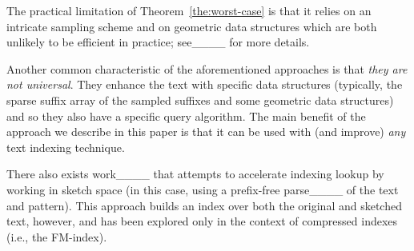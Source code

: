 The practical limitation of Theorem~\ref{the:worst-case} is that it relies on
an intricate sampling scheme and on geometric data structures
which are both unlikely to be efficient in practice; see____ for more details.


Another common characteristic of the aforementioned approaches %
is that \emph{they are not universal}. They enhance the text with specific data structures (typically, the sparse suffix array of the sampled suffixes and some geometric data structures) and so they also have a specific query algorithm. The main benefit of the approach we describe in this paper is that it can be used with (and improve) 
\emph{any} text indexing technique.

 There also exists work____ that attempts to accelerate indexing lookup by working in sketch space (in this case, using a prefix-free parse____ of the text and pattern). This approach builds an index over both the original and sketched text, however, and has been explored only in the context of compressed indexes (i.e., the FM-index).



